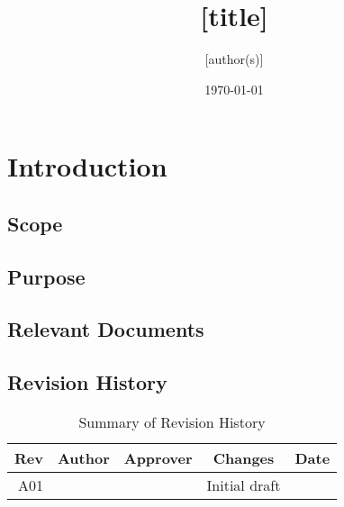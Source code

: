 \documentclass[12pt,article]{memoir}
\title{[title]}
\author{[author(s)]}
\date{\today}
\begin{document}
	


\chapter{Introduction}
\section{Scope}

\section{Purpose}

\section{Relevant Documents}

\section{Revision History}
\begin{table}[H]
	\centering
	\begin{tabu}{r || c | c | c | c }
		Rev & Author & Approver & Changes & Date\\ \hline
		A01 & & & Initial draft & \\
	\end{tabu}
	\caption{Summary of Revision History}
	\label{tab:rev}
\end{table}

\end{document}
